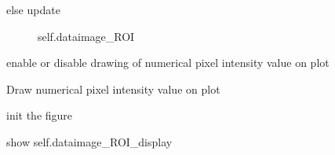\documentclass[letterpaper,10pt,english]{sphinxmanual}
\begin{document}
\begin{fulllineitems}
\begin{fulllineitems}
\begin{description}
\item[{else update}] \leavevmode
self.dataimage\_ROI

\end{description}

\end{fulllineitems}


\begin{fulllineitems}
\label{\detokenize{PeakSearchGUI:LaueTools.GUI.PeakSearchGUI.MainPeakSearchFrame.OnCheckPlotValues}}
enable or disable drawing of numerical pixel intensity value on plot

\end{fulllineitems}


\begin{fulllineitems}
\label{\detokenize{PeakSearchGUI:LaueTools.GUI.PeakSearchGUI.MainPeakSearchFrame.PlotValues}}
Draw numerical pixel intensity value on plot

\end{fulllineitems}


\begin{fulllineitems}
\label{\detokenize{PeakSearchGUI:LaueTools.GUI.PeakSearchGUI.MainPeakSearchFrame.init_figure_draw}}
init the figure

\end{fulllineitems}


\begin{fulllineitems}
\label{\detokenize{PeakSearchGUI:LaueTools.GUI.PeakSearchGUI.MainPeakSearchFrame.Show_Image}}
show self.dataimage\_ROI\_display

\end{fulllineitems}



\end{fulllineitems}
\end{document}

